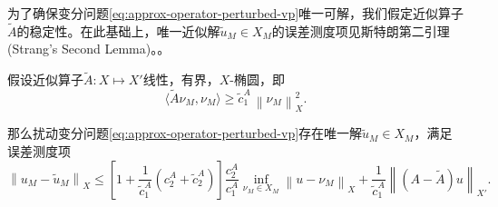 为了确保变分问题\eqref{eq:approx-operator-perturbed-vp}唯一可解，我们假定近似算子$\widetilde{A}$的稳定性。在此基础上，唯一近似解$\tilde{u}_{M} \in X_{M}$的误差测度项见斯特朗第二引理(Strang's Second Lemma)。。
\begin{theorem}[斯特朗第二引理]
  \label{theorem:approx-operator-error-term}
  假设近似算子$\widetilde{A}:X \mapsto X'$线性，有界，$X$-椭圆，即
  \begin{equation}
    \label{eq:approx-operator-tildea-ellipticity}
    \langle \widetilde{A} \nu_{M}, \nu_{M} \rangle
    \ge \tilde{c}_{1}^{A} \, \left\| \nu_{M} \right\|_{X}^{2}.
  \end{equation}

  那么扰动变分问题\eqref{eq:approx-operator-perturbed-vp}存在唯一解$\tilde{u}_{M} \in X_{M}$，满足误差测度项
  \begin{equation}
    \label{eq:approx-operator-error-term}
    \left\| u_{M} - \tilde{u}_{M} \right\|_{X}
    \le \left[ 1 + \frac{1}{\tilde{c}_{1}^{A}} \left( c_{2}^{A} + \tilde{c}_{2}^{A} \right)\right] \frac{c_{2}^{A}}{c_{1}^{A}}
    \inf_{\nu_{M} \in X_{M}} \left\| u - \nu_{M} \right\|_{X}
    + \frac{1}{\tilde{c}_{1}^{A}} \left\| \left( A - \widetilde{A} \right) u \right\|_{X'}.
  \end{equation}
\end{theorem}
